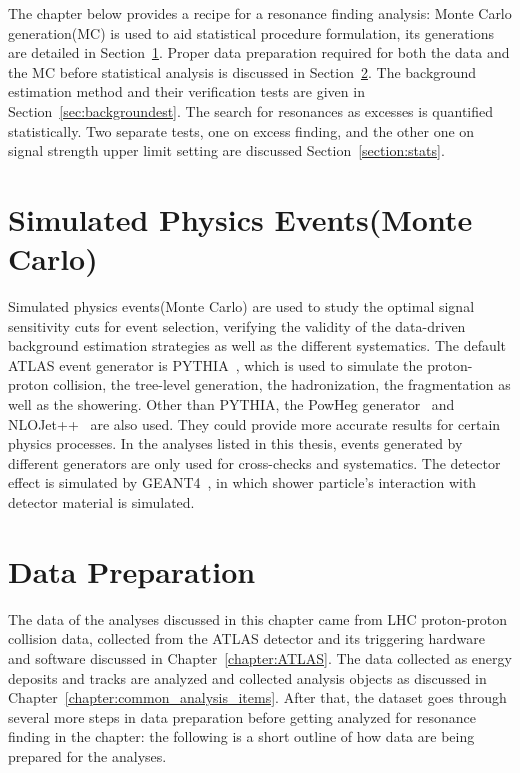 The chapter below provides a recipe for a resonance finding analysis: Monte Carlo generation(MC) is used to aid statistical procedure formulation, its generations are detailed in Section~\ref{sec:MC}. Proper data preparation required for both the data and the MC before statistical analysis is discussed in Section~\ref{sec:dataprep}. The background estimation method and their verification tests are given in Section~\ref{sec:backgroundest}. The search for resonances as excesses is quantified statistically. Two separate tests, one on excess finding, and the other one on signal strength upper limit setting are discussed Section~\ref{section:stats}. 

\section{Simulated Physics Events(Monte Carlo)}
\label{sec:MC}
Simulated physics events(Monte Carlo) are used to study the optimal signal sensitivity cuts for event selection, verifying the validity of the data-driven background estimation strategies as well as the different systematics.
The default ATLAS event generator is PYTHIA~\cite{PYTHIA}, which is used to simulate the proton-proton collision, the tree-level generation, the hadronization, the fragmentation as well as the showering. 
Other than PYTHIA, the PowHeg generator~\cite{oleari2010powheg} and NLOJet++~\cite{nagynlojet++} are also used. They could
provide more accurate results for certain physics processes. In the analyses listed in this thesis, events generated by different generators are only used for cross-checks and systematics. 
The detector effect is simulated by GEANT4~\cite{Agostinelli:602040}, in which shower particle's interaction with detector material is simulated.



\section{Data Preparation}
\label{sec:dataprep}
The data of the analyses discussed in this chapter came from LHC proton-proton collision data, collected from the ATLAS detector and its triggering hardware and software discussed in Chapter~\ref{chapter:ATLAS}. The data collected as energy deposits and tracks are analyzed and collected analysis objects as discussed in Chapter~\ref{chapter:common_analysis_items}. After that, the dataset goes through several more steps in data preparation before getting analyzed for resonance finding in the chapter: the following is a short outline of how data are being prepared for the analyses.

